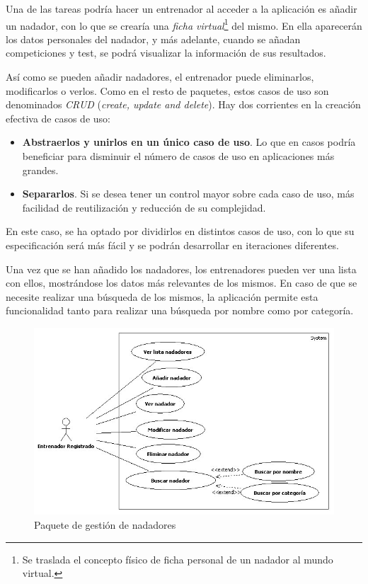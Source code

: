 		Una de las tareas podría hacer un entrenador al acceder a la aplicación es añadir un nadador, con lo que se crearía una {\it ficha virtual}\footnote{Se traslada el concepto físico de ficha personal de un nadador al mundo virtual.} del mismo. En ella aparecerán los datos personales del nadador, y más adelante, cuando se añadan competiciones y test, se podrá visualizar la información de sus resultados.
		
		Así como se pueden añadir nadadores, el entrenador puede eliminarlos, modificarlos o verlos. Como en el resto de paquetes, estos casos de uso son denominados {\it CRUD} ({\it create, update and delete}). Hay dos corrientes en la creación efectiva de casos de uso: %
		
		\begin{itemize}
			\item {{\bf Abstraerlos y unirlos en un único caso de uso}. Lo que en casos podría beneficiar para disminuir el número de casos de uso en aplicaciones más grandes.}
			\item {{\bf Separarlos}. Si se desea tener un control mayor sobre cada caso de uso, más facilidad de reutilización y reducción de su complejidad.}
		\end{itemize}
		
		En este caso, se ha optado por dividirlos en distintos casos de uso, con lo que su especificación será más fácil y se podrán desarrollar en iteraciones diferentes.
		
		Una vez que se han añadido los nadadores, los entrenadores pueden ver una lista con ellos, mostrándose los datos más relevantes de los mismos. En caso de que se necesite realizar una búsqueda de los mismos, la aplicación permite esta funcionalidad tanto para realizar una búsqueda por nombre como por categoría.
		 
		\begin{figure}[H]
		  \centering
		    \includegraphics[width=15cm]{./eps/casos_uso/gestion_nadadores.eps}
		  \caption{Paquete de gestión de nadadores}
		  \label{fig:analisis_gestion_nadadores}
		\end{figure}
		
